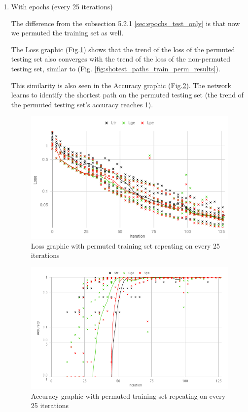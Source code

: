 \begin{enumerate}[label=(\Alph*)]
        \item With epochs (every 25 iterations)
        
        The difference from the subsection 5.2.1 \ref{sec:epochs_test_only} is that now we permuted the training set as well.
        
        The Loss graphic (Fig.\ref{fig:shotest_paths_epochs_perm_results}) shows that the trend of the loss of the permuted testing set also converges with the trend of the loss of the non-permuted testing set, similar to (Fig. \ref{fig:shotest_paths_train_perm_results}).
        
        This similarity is also seen in the Accuracy graphic (Fig.\ref{fig:shotest_paths_epochs_perm_ACC_results}). The network learns to identify the shortest path on the permuted testing set (the trend of the permuted testing set's accuracy reaches 1).
        
        \begin{figure}[H]
            \centering
            \includegraphics[width=.9\linewidth]{fig/content/results/shortest_path/epochs_perm.png}
            \caption{Loss graphic with permuted training set repeating on every 25 iterations}
            \label{fig:shotest_paths_epochs_perm_results}
        \end{figure}
        
        \begin{figure}[H]
            \centering
            \includegraphics[width=.9\linewidth]{fig/content/results/shortest_path/epochs_perm_ACC.png}
            \caption{Accuracy graphic with permuted training set repeating on every 25 iterations}
            \label{fig:shotest_paths_epochs_perm_ACC_results}
        \end{figure}
        

\end{enumerate}
